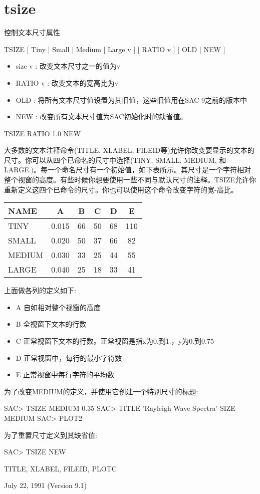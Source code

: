 \section{tsize}
\label{cmd:tsize}

控制文本尺寸属性

TSIZE [ Tiny | Small | Medium | Large v ] [ RATIO v ] [ OLD | NEW ]

\begin{itemize}
\item size v : 改变文本尺寸之一的值为v 
\item RATIO v : 改变文本的宽高比为v 
\item OLD : 将所有文本尺寸值设置为其旧值，这些旧值用在SAC 9之前的版本中 
\item NEW : 改变所有文本尺寸值为SAC初始化时的缺省值。
\end{itemize}

TSIZE RATIO 1.0 NEW

大多数的文本注释命令(TITLE, XLABEL, FILEID等)允许你改变要显示的文本的尺寸。你可以从四个已命名的尺寸中选择(TINY, SMALL, MEDIUM, 和LARGE.)。每一个命名尺寸有一个初始值，如下表所示。其尺寸是一个字符相对整个视窗的高度。有些时候你想要使用一些不同与默认尺寸的注释。TSIZE允许你重新定义这四个已命令的尺寸。你也可以使用这个命令改变字符的宽-高比。
\begin{center}
\begin{tabular}{lccccc}
\toprule
NAME	&	A	&	B	&	C	&	D	&	E	\\
\midrule
TINY 	& 0.015 &   66 	&  50  	&	68  &	110	\\
SMALL	& 0.020 &	50  &  37  	&	66  &	82	\\
MEDIUM  & 0.030 &	33  &  25  	&	44  &	55	\\
LARGE	& 0.040 &	25  &  18  	&	33  &	41	\\
\bottomrule
\end{tabular}
\end{center}

上面做各列的定义如下:
\begin{itemize}
\item A 自如相对整个视窗的高度
\item B 全视窗下文本的行数
\item C 正常视窗下文本的行数。正常视窗是指x为0.到1.，y为0.到0.75
\item D 正常视窗中，每行的最小字符数
\item E 正常视窗中每行字符的平均数
\end{itemize}

为了改变MEDIUM的定义，并使用它创建一个特别尺寸的标题:
\begin{SACCode}
SAC> TSIZE MEDIUM 0.35
SAC> TITLE 'Rayleigh Wave Spectra' SIZE MEDIUM
SAC> PLOT2
\end{SACCode}

为了重置尺寸定义到其缺省值:
\begin{SACCode}
SAC> TSIZE NEW
\end{SACCode}

TITLE, XLABEL, FILEID, PLOTC

July 22, 1991 (Version 9.1)

